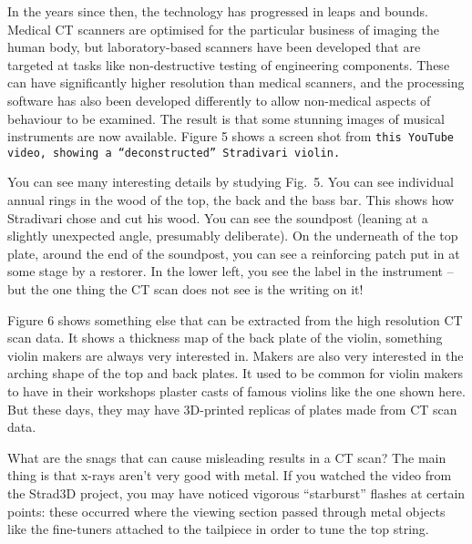   In the years since then, the technology has progressed in leaps and bounds. 
  Medical CT scanners are optimised for the particular business of imaging the 
  human body, but laboratory-based scanners have been developed that are 
  targeted at tasks like non-destructive testing of engineering components. 
  These can have significantly higher resolution than medical scanners, and the 
  processing software has also been developed differently to allow non-medical 
  aspects of behaviour to be examined. The result is that some stunning images 
  of musical instruments are now available. Figure 5 shows a screen shot from 
  \tt{}this YouTube video\rm{}, showing a “deconstructed” Stradivari violin. 


  You can see many interesting details by studying Fig.\ 5. You can see 
  individual annual rings in the wood of the top, the back and the bass bar. 
  This shows how Stradivari chose and cut his wood. You can see the soundpost 
  (leaning at a slightly unexpected angle, presumably deliberate). On the 
  underneath of the top plate, around the end of the soundpost, you can see a 
  reinforcing patch put in at some stage by a restorer. In the lower left, you 
  see the label in the instrument -- but the one thing the CT scan does not see 
  is the writing on it! 

  Figure 6 shows something else that can be extracted from the high resolution 
  CT scan data. It shows a thickness map of the back plate of the violin, 
  something violin makers are always very interested in. Makers are also very 
  interested in the arching shape of the top and back plates. It used to be 
  common for violin makers to have in their workshops plaster casts of famous 
  violins like the one shown here. But these days, they may have 3D-printed 
  replicas of plates made from CT scan data. 


  What are the snags that can cause misleading results in a CT scan? The main 
  thing is that x-rays aren’t very good with metal. If you watched the video 
  from the Strad3D project, you may have noticed vigorous “starburst” flashes 
  at certain points: these occurred where the viewing section passed through 
  metal objects like the fine-tuners attached to the tailpiece in order to tune 
  the top string. 

